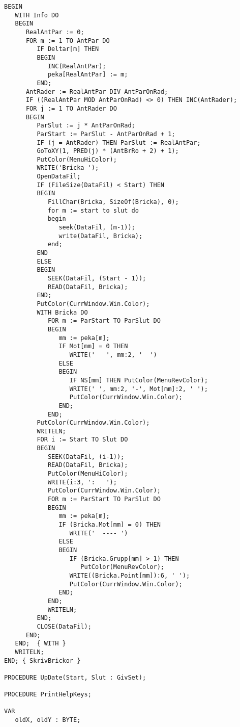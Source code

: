 \begin{verbatim}
BEGIN
   WITH Info DO
   BEGIN
      RealAntPar := 0;
      FOR m := 1 TO AntPar DO
         IF Deltar[m] THEN
         BEGIN
            INC(RealAntPar);
            peka[RealAntPar] := m;
         END;
      AntRader := RealAntPar DIV AntParOnRad;
      IF ((RealAntPar MOD AntParOnRad) <> 0) THEN INC(AntRader);
      FOR j := 1 TO AntRader DO
      BEGIN
         ParSlut := j * AntParOnRad;
         ParStart := ParSlut - AntParOnRad + 1;
         IF (j = AntRader) THEN ParSlut := RealAntPar;
         GoToXY(1, PRED(j) * (AntBrRo + 2) + 1);
         PutColor(MenuHiColor);
         WRITE('Bricka ');
         OpenDataFil;
         IF (FileSize(DataFil) < Start) THEN
         BEGIN
            FillChar(Bricka, SizeOf(Bricka), 0);
            for m := start to slut do
            begin
               seek(DataFil, (m-1));
               write(DataFil, Bricka);
            end;
         END
         ELSE
         BEGIN
            SEEK(DataFil, (Start - 1));
            READ(DataFil, Bricka);
         END;
         PutColor(CurrWindow.Win.Color);
         WITH Bricka DO
            FOR m := ParStart TO ParSlut DO
            BEGIN
               mm := peka[m];
               IF Mot[mm] = 0 THEN
                  WRITE('   ', mm:2, '  ')
               ELSE
               BEGIN
                  IF NS[mm] THEN PutColor(MenuRevColor);
                  WRITE(' ', mm:2, '-', Mot[mm]:2, ' ');
                  PutColor(CurrWindow.Win.Color);
               END;
            END;
         PutColor(CurrWindow.Win.Color);
         WRITELN;
         FOR i := Start TO Slut DO
         BEGIN
            SEEK(DataFil, (i-1));
            READ(DataFil, Bricka);
            PutColor(MenuHiColor);
            WRITE(i:3, ':   ');
            PutColor(CurrWindow.Win.Color);
            FOR m := ParStart TO ParSlut DO
            BEGIN
               mm := peka[m];
               IF (Bricka.Mot[mm] = 0) THEN
                  WRITE('  ---- ')
               ELSE
               BEGIN
                  IF (Bricka.Grupp[mm] > 1) THEN
                     PutColor(MenuRevColor);
                  WRITE((Bricka.Point[mm]):6, ' ');
                  PutColor(CurrWindow.Win.Color);
               END;
            END;
            WRITELN;
         END;
         CLOSE(DataFil);
      END;
   END;  { WITH }
   WRITELN;
END; { SkrivBrickor }

PROCEDURE UpDate(Start, Slut : GivSet);

PROCEDURE PrintHelpKeys;

VAR
   oldX, oldY : BYTE;


\end{verbatim}
